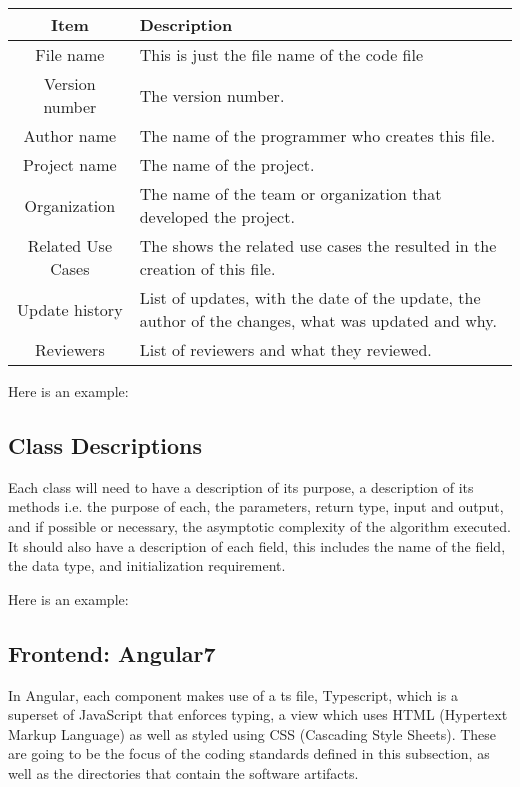 \documentclass[11pt]{article}
\begin{document}
\begin{tabular}{|c|p{14cm}|}
	\hline
	Item & Description \\
	\hline
	File name & This is just the file name of the code file \\
	\hline
	Version number & The version number.\\
	\hline
	Author name & The name of the programmer who creates this file. \\
	\hline
	Project name & The name of the project. \\
	\hline
	Organization & The name of the team or organization that developed the project. \\
	\hline
	Related Use Cases & The shows the related use cases the resulted in the creation of this file. \\
	\hline
	Update history & List of updates, with the date of the update, the author of the changes, what was updated and why. \\
	\hline
	Reviewers & List of reviewers and what they reviewed. \\
	\hline
\end{tabular}

Here is an example: 

\subsection{Class Descriptions}

Each class will need to have a description of its purpose, a description of its methods i.e. the purpose of each, the parameters, return type, input and output, and if possible or necessary, the asymptotic complexity of the algorithm executed\cite{Book:1}. It should also have a description of each field, this includes the name of the field, the data type, and initialization requirement. 

Here is an example: 

\subsection{Frontend: Angular7}

In Angular, each component makes use of a ts file, Typescript, which is a superset of JavaScript that enforces typing, a view which uses HTML (Hypertext Markup Language) as well as styled using CSS (Cascading Style Sheets). These are going to be the focus of the coding standards defined in this subsection, as well as the directories that contain the software artifacts.
\end{document}
